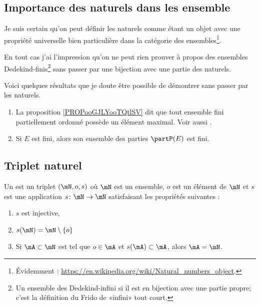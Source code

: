 \subsection{Importance des naturels dans les ensemble}

\begin{normaltext}		\label{NORMooLNLHooLYKwDu}
	Je suis certain qu'on peut définir les naturels comme étant un objet avec une propriété universelle bien particulière dans la catégorie des ensembles\footnote{Évidemment : \url{https://en.wikipedia.org/wiki/Natural_numbers_object}.}.

	En tout cas j'ai l'impression qu'on ne peut rien prouver à propos des ensembles Dedekind-finis\footnote{Un ensemble des Dedekind-infini si il est en bijection avec une partie propre; c'est la définition du Frido de «infini» tout court.} sans passer par une bijection avec une partie des naturels.

	Voici quelques résultats que je doute être possible de démontrer sans passer par les naturels.
	\begin{enumerate}
		\item
		      La proposition \ref{PROPooGJLYooTQtlSV} dit que tout ensemble fini partiellement ordonné possède un élément maximal. Voir aussi \cite{BIBooFUKSooQARznK}.
		\item
		      Si \( E\) est fini, alors son ensemble des parties \( \partP(E)\) est fini.
	\end{enumerate}
\end{normaltext}

\subsection{Triplet naturel}
\label{SUBooTripletNaturel}

\begin{definition}     \label{DEFooBJBOooWlblAx}
	Un  est un triplet \( (\mN, o, s)\) où \( \mN\) est un ensemble, \( o\) est un élément de \( \mN\) et \( s\) est une application \( s\colon \mN\to \mN\) satisfaisant les propriétés suivantes :
	\begin{enumerate}
		\item
		      \( s\) est injective,
		\item       \label{ITEMooQAKJooGKdJsM}
		      \( s(\mN)=\mN\setminus \{ o \} \)
		\item       \label{ITEMooXPYEooFajywh}
		      Si \( \mA\subset \mN\) est tel que \( o\in \mA\) et \( s(\mA)\subset \mA\), alors \( \mA=\mN\).
	\end{enumerate}
\end{definition}

